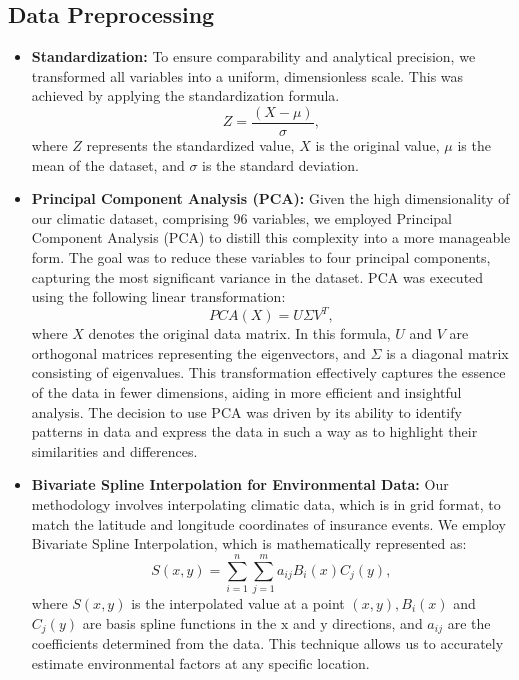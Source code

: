 \documentclass[12pt]{article}
\begin{document}
\subsection{Data Preprocessing}
\begin{itemize}
\item \textbf{Standardization:} To ensure comparability and analytical precision, we transformed all variables into a uniform, dimensionless scale. This was achieved by applying the standardization formula.
\begin{equation}
Z=\frac{(X-\mu)}{\sigma},
\end{equation}
where $Z$ represents the standardized value, $X$ is the original value, $\mu$ is the mean of the dataset, and $\sigma$ is the standard deviation.

\item \textbf{Principal Component Analysis (PCA):} Given the high dimensionality of our climatic dataset, comprising 96 variables, we employed Principal Component Analysis (PCA) to distill this complexity into a more manageable form. The goal was to reduce these variables to four principal components, capturing the most significant variance in the dataset. PCA was executed using the following linear transformation:
\begin{equation}
  PCA(X) = U \Sigma V^T,
\end{equation}
where \( X \) denotes the original data matrix. In this formula, \( U \) and \( V \) are orthogonal matrices representing the eigenvectors, and \( \Sigma \) is a diagonal matrix consisting of eigenvalues. This transformation effectively captures the essence of the data in fewer dimensions, aiding in more efficient and insightful analysis. The decision to use PCA was driven by its ability to identify patterns in data and express the data in such a way as to highlight their similarities and differences.


\item \textbf{Bivariate Spline Interpolation for Environmental Data:} Our methodology involves interpolating climatic data, which is in grid format, to match the latitude and longitude coordinates of insurance events. We employ Bivariate Spline Interpolation, which is mathematically represented as:
\begin{equation}
S(x, y) = \sum_{i=1}^{n} \sum_{j=1}^{m} a_{ij} B_{i}(x) C_{j}(y),
\end{equation}
where $S(x, y)$ is the interpolated value at a point $(x, y), B_i(x)$ and $C_j(y)$ are basis spline functions in the $\mathrm{x}$ and $\mathrm{y}$ directions, and $a_{i j}$ are the coefficients determined from the data. This technique allows us to accurately estimate environmental factors at any specific location.


\end{itemize}
\end{document}
